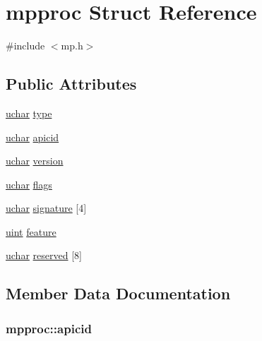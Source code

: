 \hypertarget{structmpproc}{}\section{mpproc Struct Reference}
\label{structmpproc}


{\ttfamily \#include $<$mp.\+h$>$}

\subsection*{Public Attributes}
\begin{DoxyCompactItemize}
\item 
\hyperlink{custom__types_8h_a65f85814a8290f9797005d3b28e7e5fc}{uchar} \hyperlink{structmpproc_acd7371100bf5624c8eafe1280826f358}{type}
\item 
\hyperlink{custom__types_8h_a65f85814a8290f9797005d3b28e7e5fc}{uchar} \hyperlink{structmpproc_a935db2a1561da721c867f4b82c51d04d}{apicid}
\item 
\hyperlink{custom__types_8h_a65f85814a8290f9797005d3b28e7e5fc}{uchar} \hyperlink{structmpproc_a6d7948bc046404527c0eec71e3e93209}{version}
\item 
\hyperlink{custom__types_8h_a65f85814a8290f9797005d3b28e7e5fc}{uchar} \hyperlink{structmpproc_abac8cdeb6e601ce8e5bf343c8efb3680}{flags}
\item 
\hyperlink{custom__types_8h_a65f85814a8290f9797005d3b28e7e5fc}{uchar} \hyperlink{structmpproc_a2e18fc2c01b252da2c0d671fdce95eb5}{signature} \mbox{[}4\mbox{]}
\item 
\hyperlink{custom__types_8h_a91ad9478d81a7aaf2593e8d9c3d06a14}{uint} \hyperlink{structmpproc_a62dc15542eee0797a4636b701439b6d9}{feature}
\item 
\hyperlink{custom__types_8h_a65f85814a8290f9797005d3b28e7e5fc}{uchar} \hyperlink{structmpproc_a94bbb1f4794bcf6126fb36520f668134}{reserved} \mbox{[}8\mbox{]}
\end{DoxyCompactItemize}


\subsection{Member Data Documentation}
\subsubsection[{\texorpdfstring{apicid}{apicid}}]{ mpproc\+::apicid}\hypertarget{structmpproc_a935db2a1561da721c867f4b82c51d04d}{}\label{structmpproc_a935db2a1561da721c867f4b82c51d04d}
